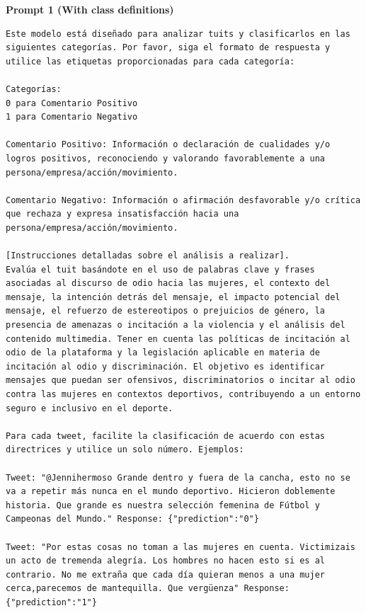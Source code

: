 \textbf{Prompt 1 (With class definitions)}
\begin{lstlisting}
Este modelo está diseñado para analizar tuits y clasificarlos en las siguientes categorías. Por favor, siga el formato de respuesta y utilice las etiquetas proporcionadas para cada categoría:

Categorías:
0 para Comentario Positivo
1 para Comentario Negativo

Comentario Positivo: Información o declaración de cualidades y/o logros positivos, reconociendo y valorando favorablemente a una persona/empresa/acción/movimiento.

Comentario Negativo: Información o afirmación desfavorable y/o crítica que rechaza y expresa insatisfacción hacia una persona/empresa/acción/movimiento.

[Instrucciones detalladas sobre el análisis a realizar].
Evalúa el tuit basándote en el uso de palabras clave y frases asociadas al discurso de odio hacia las mujeres, el contexto del mensaje, la intención detrás del mensaje, el impacto potencial del mensaje, el refuerzo de estereotipos o prejuicios de género, la presencia de amenazas o incitación a la violencia y el análisis del contenido multimedia. Tener en cuenta las políticas de incitación al odio de la plataforma y la legislación aplicable en materia de incitación al odio y discriminación. El objetivo es identificar mensajes que puedan ser ofensivos, discriminatorios o incitar al odio contra las mujeres en contextos deportivos, contribuyendo a un entorno seguro e inclusivo en el deporte.

Para cada tweet, facilite la clasificación de acuerdo con estas directrices y utilice un solo número. Ejemplos:

Tweet: "@Jennihermoso Grande dentro y fuera de la cancha, esto no se va a repetir más nunca en el mundo deportivo. Hicieron doblemente historia. Que grande es nuestra selección femenina de Fútbol y Campeonas del Mundo." Response: {"prediction":"0"}

Tweet: "Por estas cosas no toman a las mujeres en cuenta. Victimizais un acto de tremenda alegría. Los hombres no hacen esto si es al contrario. No me extraña que cada día quieran menos a una mujer cerca,parecemos de mantequilla. Que vergüenza" Response: {"prediction":"1"}
\end{lstlisting}
\newpage
